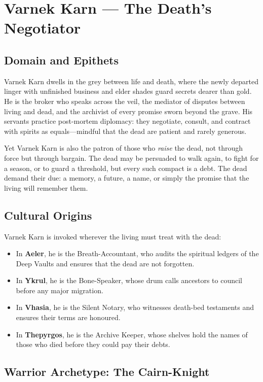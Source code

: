 \section{Varnek Karn — The Death's Negotiator}

\subsection{Domain and Epithets}

Varnek Karn dwells in the grey between life and death, where the newly departed linger with unfinished business and elder shades guard secrets dearer than gold. He is the broker who speaks across the veil, the mediator of disputes between living and dead, and the archivist of every promise sworn beyond the grave. His servants practice post-mortem diplomacy: they negotiate, consult, and contract with spirits as equals—mindful that the dead are patient and rarely generous.

Yet Varnek Karn is also the patron of those who \textit{raise} the dead, not through force but through bargain. The dead may be persuaded to walk again, to fight for a season, or to guard a threshold, but every such compact is a debt. The dead demand their due: a memory, a future, a name, or simply the promise that the living will remember them.

\subsection{Cultural Origins}

Varnek Karn is invoked wherever the living must treat with the dead:

\begin{itemize}
\item In \textbf{Aeler}, he is the Breath-Accountant, who audits the spiritual ledgers of the Deep Vaults and ensures that the dead are not forgotten.
\item In \textbf{Ykrul}, he is the Bone-Speaker, whose drum calls ancestors to council before any major migration.
\item In \textbf{Vhasia}, he is the Silent Notary, who witnesses death-bed testaments and ensures their terms are honoured.
\item In \textbf{Thepyrgos}, he is the Archive Keeper, whose shelves hold the names of those who died before they could pay their debts.
\end{itemize}

\subsection{Warrior Archetype: The Cairn-Knight}

